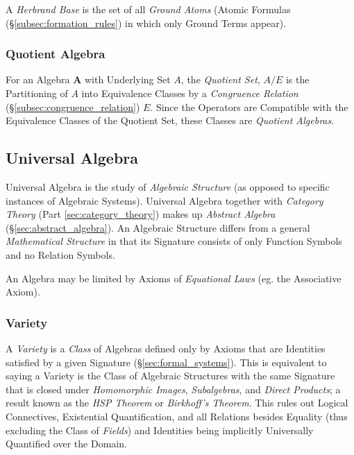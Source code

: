 \documentclass{article}
\begin{document}
A \emph{Herbrand Base} is the set of all \emph{Ground Atoms} (Atomic
Formulas (\S\ref{subsec:formation_rules}) in which only Ground Terms
appear).

\subsubsection{Quotient Algebra}\label{subsec:quotient_algebra}

For an Algebra $\mathbf{A}$ with Underlying Set $A$, the
\emph{Quotient Set}, $A / E$ is the Partitioning of $A$ into
Equivalence Classes by a \emph{Congruence Relation}
(\S\ref{subsec:congruence_relation}) $E$. Since the Operators are
Compatible with the Equivalence Classes of the Quotient Set, these
Classes are \emph{Quotient Algebras}.

\subsection{Universal Algebra}\label{subsec:universal_algebra}

Universal Algebra is the study of \emph{Algebraic Structure} (as
opposed to specific instances of Algebraic Systems). Universal Algebra
together with \emph{Category Theory} (Part \ref{sec:category_theory})
makes up \emph{Abstract Algebra} (\S\ref{sec:abstract_algebra}). An
Algebraic Structure differs from a general \emph{Mathematical
  Structure} in that its Signature consists of only Function Symbols
and no Relation Symbols.

An Algebra may be limited by Axioms of \emph{Equational Laws} (eg. the
Associative Axiom).



\subsubsection{Variety}\label{subsec:model_variety}

A \emph{Variety} is a \emph{Class} of Algebras defined only by Axioms
that are Identities satisfied by a given Signature
(\S\ref{sec:formal_systems}). This is equivalent to saying a Variety
is the Class of Algebraic Structures with the same Signature that is
closed under \emph{Homomorphic Images}, \emph{Subalgebras}, and
\emph{Direct Products}; a result known as the \emph{HSP Theorem} or
\emph{Birkhoff's Theorem}\cite{birkhoff35}. This rules out Logical
Connectives, Existential Quantification, and all Relations besides
Equality (thus excluding the Class of \emph{Fields}) and Identities
being implicitly Universally Quantified over the Domain.
\end{document}
